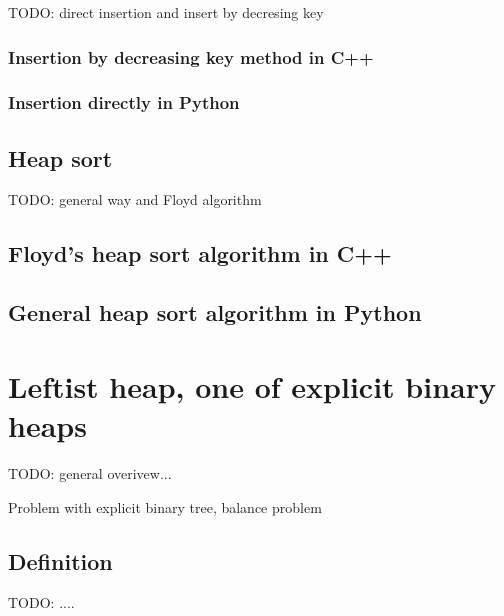 \documentclass{article}
\begin{document}
TODO: direct insertion and insert by decresing key

\subsubsection*{Insertion by decreasing key method in C++}

\subsubsection*{Insertion directly in Python}

\subsection{Heap sort}

TODO: general way and Floyd algorithm

\subsection*{Floyd's heap sort algorithm in C++}

\subsection*{General heap sort algorithm in Python}

\section{Leftist heap, one of explicit binary heaps}
\label{ebheap}

TODO: general overivew...

Problem with explicit binary tree, balance problem

\subsection{Definition}

TODO: ....
\end{document}
